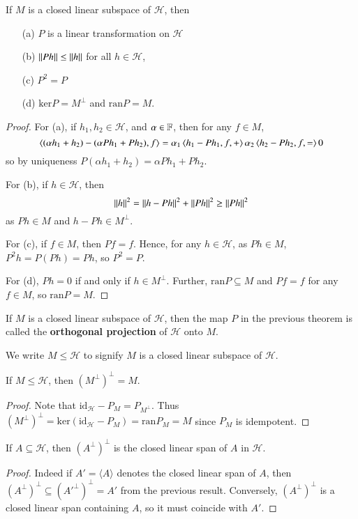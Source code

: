 \begin{thm}
    If $M$ is a closed linear subspace of $\mathscr{H}$, then \begin{enumerate}
        \item[(a)] $P$ is a linear transformation on $\mathscr{H}$
        \item[(b)] $\left|\left| Ph\right|\right|\leq \left|\left| h\right|\right|$ for all $h \in \mathscr{H}$,
        \item[(c)] $P^2 = P$
        \item[(d)] $\text{ker} P = M^{\perp}$ and $\text{ran} P = M$.
    \end{enumerate}
\end{thm}
\begin{proof}
    For (a), if $h_1,h_2 \in \mathscr{H}$, and $\alpha \in \mathbb F$, then for any $f \in M$, $$\left\langle (\alpha h_1+h_2)-(\alpha Ph_1+Ph_2), f\right\rangle = \alpha_1\left\langle h_1-Ph_1,f, +\right\rangle\alpha_2\left\langle h_2-Ph_2,f, =\right\rangle 0$$
    so by uniqueness $P(\alpha h_1+h_2) = \alpha Ph_1 + Ph_2$.

    For (b), if $h \in \mathscr{H}$, then $$\left|\left| h\right|\right|^2 = \left|\left| h-Ph\right|\right|^2+\left|\left| Ph\right|\right|^2 \geq \left|\left| Ph\right|\right|^2$$
    as $Ph \in M$ and $h-Ph \in M^{\perp}$.

    For (c), if $f \in M$, then $Pf = f$. Hence, for any $h \in \mathscr{H}$, as $Ph \in M$, $P^2h = P(Ph) = Ph$, so $P^2 = P$.

    For (d), $Ph = 0$ if and only if $h \in M^{\perp}$. Further, $\text{ran} P \subseteq M$ and $Pf = f$ for any $f \in M$, so $\text{ran} P = M$.
\end{proof}

\begin{defn}
    If $M$ is a closed linear subspace of $\mathscr{H}$, then the map $P$ in the previous theorem is called the \textbf{orthogonal projection} of $\mathscr{H}$ onto $M$.
\end{defn}

We write $M \leq \mathscr{H}$ to signify $M$ is a closed linear subspace of $\mathscr{H}$.

\begin{cor}
    If $M \leq \mathscr{H}$, then $(M^{\perp})^{\perp} = M$.
\end{cor}
\begin{proof}
    Note that $\text{id}_{\mathscr{H}} - P_M = P_{M^{\perp}}$. Thus $(M^{\perp})^{\perp} = \text{ker}(\text{id}_{\mathscr{H}} - P_M) = \text{ran} P_M = M$ since $P_M$ is idempotent.
\end{proof}

\begin{cor}
    If $A \subseteq \mathscr{H}$, then $(A^{\perp})^{\perp}$ is the closed linear span of $A$ in $\mathscr{H}$.
\end{cor}
\begin{proof}
    Indeed if $A' = \langle A\rangle$ denotes the closed linear span of $A$, then $(A^{\perp})^{\perp} \subseteq ({A'}^{\perp})^{\perp} = A'$ from the previous result. Conversely, $(A^{\perp})^{\perp}$ is a closed linear span containing $A$, so it must coincide with $A'$.
\end{proof}

